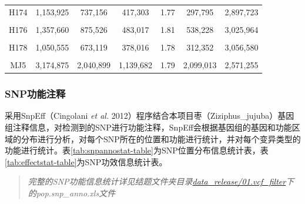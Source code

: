 \documentclass[
  a4paper,
  titlepage]{article}
\begin{document}
\begin{longtable}[t]{ccccccc}
H174 & 1,153,925 & 737,156 & 417,303 & 1.77 & 297,795 & 2,897,723\\
 
\cellcolor{gray!6}{H175} & \cellcolor{gray!6}{1,027,102} & \cellcolor{gray!6}{654,840} & \cellcolor{gray!6}{372,781} & \cellcolor{gray!6}{1.76} & \cellcolor{gray!6}{268,203} & \cellcolor{gray!6}{2,932,255}\\
 
H176 & 1,357,660 & 875,526 & 483,017 & 1.81 & 538,228 & 3,025,964\\
 
\cellcolor{gray!6}{H177} & \cellcolor{gray!6}{1,194,030} & \cellcolor{gray!6}{767,005} & \cellcolor{gray!6}{427,692} & \cellcolor{gray!6}{1.79} & \cellcolor{gray!6}{362,657} & \cellcolor{gray!6}{2,980,631}\\
 
H178 & 1,050,555 & 673,119 & 378,016 & 1.78 & 312,352 & 3,056,580\\
 
\cellcolor{gray!6}{H179} & \cellcolor{gray!6}{1,147,366} & \cellcolor{gray!6}{741,915} & \cellcolor{gray!6}{406,114} & \cellcolor{gray!6}{1.83} & \cellcolor{gray!6}{339,101} & \cellcolor{gray!6}{2,947,237}\\
 
MJ5 & 3,174,875 & 2,040,899 & 1,139,682 & 1.79 & 2,099,013 & 2,571,255\\*
\end{longtable}

\hypertarget{snpux529fux80fdux6ce8ux91ca}{%
\subsubsection{SNP功能注释}\label{snpux529fux80fdux6ce8ux91ca}}

采用SnpEff（Cingolani \emph{et al.} 2012）程序结合本项目枣（Ziziphus\_jujuba）基因组注释信息，对检测到的SNP进行功能注释，SnpEff会根据基因组的基因和功能区域的分布进行分析，对每个SNP所在的位置和功能进行统计，并对每个变异类型的功能进行统计。表\ref{tab:snpannostat-table}为SNP位置分布信息统计表，表\ref{tab:effectstat-table}为SNP功效信息统计表。

\begin{quote}
\emph{完整的SNP功能信息统计详见结题文件夹目录\href{./data_release/01.vcf_filter}{data\_release/01.vcf\_filter}下的pop.snp\_anno.xls文件}
\end{quote}
\end{document}
